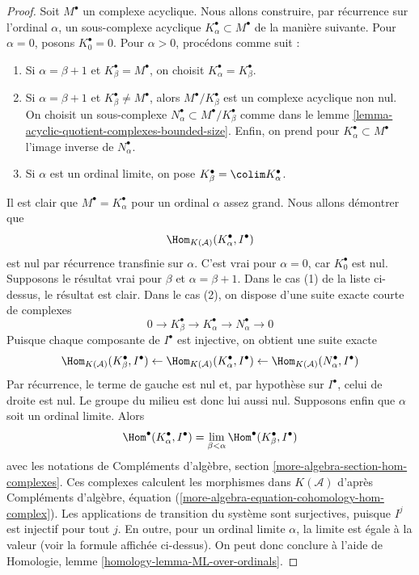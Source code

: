 \begin{proof}
Soit $M^\bullet$ un complexe acyclique. Nous allons construire, par
récurrence sur l'ordinal $\alpha$, un sous-complexe acyclique
$K_\alpha^\bullet \subset M^\bullet$ de la manière suivante.
Pour $\alpha = 0$, posons $K_0^\bullet = 0$. Pour $\alpha > 0$,
procédons comme suit :
\begin{enumerate}
\item Si $\alpha = \beta + 1$ et $K_\beta^\bullet = M^\bullet$,
on choisit $K_\alpha^\bullet = K_\beta^\bullet$.
\item Si $\alpha = \beta + 1$ et $K_\beta^\bullet \not = M^\bullet$,
alors $M^\bullet/K_\beta^\bullet$ est un complexe acyclique non nul.
On choisit un sous-complexe
$N_\alpha^\bullet \subset M^\bullet/K_\beta^\bullet$ comme dans le
lemme \ref{lemma-acyclic-quotient-complexes-bounded-size}.
Enfin, on prend pour $K_\alpha^\bullet \subset M^\bullet$
l'image inverse de $N_\alpha^\bullet$.
\item Si $\alpha$ est un ordinal limite, on pose
$K_\beta^\bullet = \colim K_\alpha^\bullet$.
\end{enumerate}
Il est clair que $M^\bullet = K_\alpha^\bullet$ pour un ordinal $\alpha$
assez grand. Nous allons démontrer que
$$
\Hom_{K(\mathcal{A})}(K_\alpha^\bullet, I^\bullet)
$$
est nul par récurrence transfinie sur $\alpha$. C'est vrai pour $\alpha = 0$,
car $K_0^\bullet$ est nul. Supposons le résultat vrai pour $\beta$ et
$\alpha = \beta + 1$. Dans le cas (1) de la liste ci-dessus, le résultat est
clair. Dans le cas (2), on dispose d'une suite exacte courte de complexes
$$
0 \to K_\beta^\bullet \to K_\alpha^\bullet \to N_\alpha^\bullet \to 0
$$
Puisque chaque composante de $I^\bullet$ est injective, on obtient une suite
exacte
$$
\Hom_{K(\mathcal{A})}(K_\beta^\bullet, I^\bullet) \leftarrow
\Hom_{K(\mathcal{A})}(K_\alpha^\bullet, I^\bullet) \leftarrow
\Hom_{K(\mathcal{A})}(N_\alpha^\bullet, I^\bullet)
$$
Par récurrence, le terme de gauche est nul et, par hypothèse sur
$I^\bullet$, celui de droite est nul. Le groupe du milieu est donc lui aussi
nul. Supposons enfin que $\alpha$ soit un ordinal limite. Alors
$$
\Hom^\bullet(K_\alpha^\bullet, I^\bullet) =
\lim_{\beta < \alpha} \Hom^\bullet(K_\beta^\bullet, I^\bullet)
$$
avec les notations de
Compléments d'algèbre, section \ref{more-algebra-section-hom-complexes}.
Ces complexes calculent les morphismes dans $K(\mathcal{A})$ d'après
Compléments d'algèbre, équation
(\ref{more-algebra-equation-cohomology-hom-complex}).
Les applications de transition du système sont surjectives, puisque $I^j$
est injectif pour tout $j$. En outre, pour un ordinal limite $\alpha$, la
limite est égale à la valeur (voir la formule affichée ci-dessus). On peut donc
conclure à l'aide de
Homologie, lemme \ref{homology-lemma-ML-over-ordinals}.
\end{proof}

